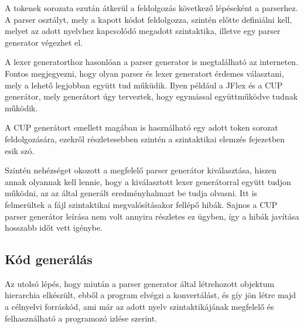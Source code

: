 A tokenek sorozata ezután átkerül a feldolgozás következő lépéseként a parserhez. A parser osztályt, mely a kapott kódot feldolgozza, szintén előtte definiálni kell, melyet az adott nyelvhez kapcsolódó megadott szintaktika, illetve egy parser generator végezhet el.

A lexer generatorthoz hasonlóan a parser generator is megtalálható az interneten. Fontos megjegyezni, hogy olyan parser és lexer generatort érdemes választani, mely a lehető legjobban együtt tud műküdik. Ilyen például a JFlex és a CUP generátor, mely generátort úgy terveztek, hogy egymással együttműködve tudnak működik.

A CUP generátort emellett magában is használható egy adott token sorozat feldolgozására, ezekről részletesebben szintén a szintaktikai elemzés fejezetben esik szó.

Szintén nehézséget okozott a megfelelő parser generátor kiválasztása, hiszen annak olyannak kell lennie, hogy a kiválasztott lexer generátorral együtt tudjon működni, az az által generált eredményhalmazt be tudja olvasni. Itt is felmerültek a fájl szintaktikai megvalósításakor fellépő hibák. Sajnos a CUP parser generátor leírása nem volt annyira részletes ez ügyben, így a hibák javítása hosszabb időt vett igénybe.

\subsection{Kód generálás}

Az utolsó lépés, hogy miután a parser generator által létrehozott objektum hierarchia elkészült, ebből a program elvégzi a konvertálást, és gíy jön létre majd a célnyelvi forráskód, ami már az adott nyelv szintaktikájának megfelelő és felhasználható a programozó izlése szerint.
